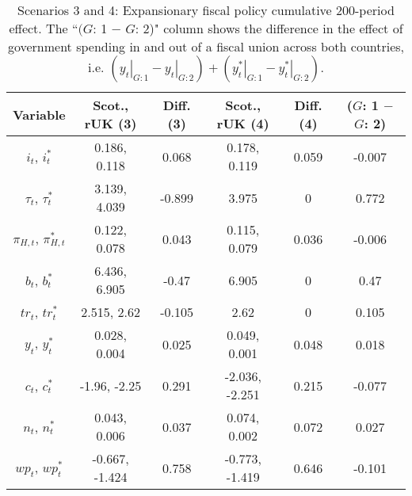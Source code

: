 \begin{table}[H]
\centering
\begin{tabular}{cccccc}
  \hline
{\textbf{Variable}} & {\textbf{Scot., rUK (3)}} & {\textbf{Diff. (3)}} & {\textbf{Scot., rUK (4)}} & {\textbf{Diff. (4)}} & {\textbf{($G$: 1 $-$ $G$: 2)}} \\ 
  \hline
${i_t}$, ${i^*_t}$ & 0.186, 0.118 & 0.068 & 0.178, 0.119 & 0.059 & -0.007 \\ 
  ${\tau_t}$, ${\tau^*_t}$ & 3.139, 4.039 & -0.899 & 3.975 & 0 & 0.772 \\ 
  ${\pi_{H,t}}$, ${\pi^*_{H,t}}$ & 0.122, 0.078 & 0.043 & 0.115, 0.079 & 0.036 & -0.006 \\ 
  ${b_t}$, ${b^*_t}$ & 6.436, 6.905 & -0.47 & 6.905 & 0 & 0.47 \\ 
  ${tr_t}$, ${tr^*_t}$ & 2.515, 2.62 & -0.105 & 2.62 & 0 & 0.105 \\ 
  ${y_t}$, ${y^*_t}$ & 0.028, 0.004 & 0.025 & 0.049, 0.001 & 0.048 & 0.018 \\ 
  ${c_t}$, ${c^*_t}$ & -1.96, -2.25 & 0.291 & -2.036, -2.251 & 0.215 & -0.077 \\ 
  ${n_t}$, ${n^*_t}$ & 0.043, 0.006 & 0.037 & 0.074, 0.002 & 0.072 & 0.027 \\ 
  ${wp_t}$, ${wp^*_t}$ & -0.667, -1.424 & 0.758 & -0.773, -1.419 & 0.646 & -0.101 \\ 
   \hline
\end{tabular}
\caption{Scenarios 3 and 4: Expansionary fiscal policy cumulative 200-period effect. The ``$(G$: 1 $-$ $G$: 2)" column shows the difference in the effect of government spending in and out of a fiscal union across both countries, i.e. $(\left. y_t \right|_{G:1} - \left. y_t \right|_{G:2}) + (\left. y^*_t \right|_{G:1} - \left. y^*_t \right|_{G:2})$.} 
\label{table:responses_three_four}
\end{table}
